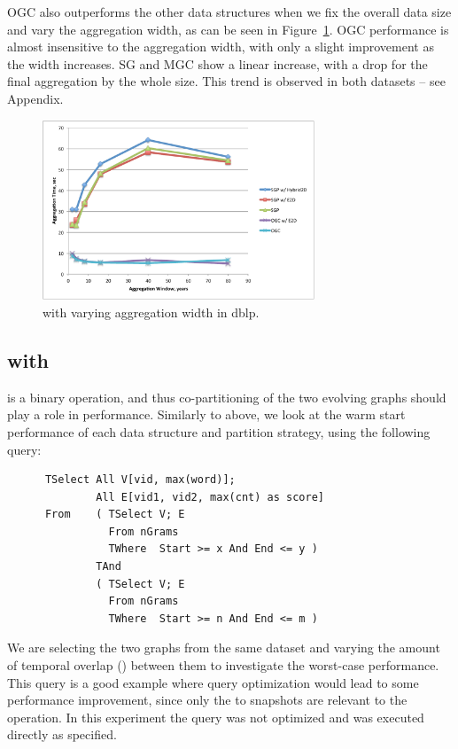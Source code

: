 OGC also outperforms the other data structures when we fix the overall
data size and vary the aggregation width, as can be seen in
Figure~\ref{fig:tgroupe_width}.  OGC performance is almost insensitive
to the aggregation width, with only a slight improvement as the width
increases.  SG and MGC show a linear increase, with a drop for the
final aggregation by the whole size.  This trend is observed in both
datasets -- see Appendix.

\begin{figure}[t]
\includegraphics[width=3.2in]{figs/tgroupe_width.pdf}
\caption{ with varying aggregation width in dblp.}
\label{fig:tgroupe_width}
\end{figure}

\subsection{ with }

 is a binary operation, and thus co-partitioning of the
two evolving graphs should play a role in performance.  Similarly to
 above, we look at the warm start performance of each
data structure and partition strategy, using the following query:

\begin{small}
\begin{verbatim}
      TSelect All V[vid, max(word)];
              All E[vid1, vid2, max(cnt) as score]
      From    ( TSelect V; E
                From nGrams
                TWhere  Start >= x And End <= y )
              TAnd
              ( TSelect V; E
                From nGrams
                TWhere  Start >= n And End <= m )      
\end{verbatim}
\end{small}

We are selecting the two graphs from the same dataset and varying the
amount of temporal overlap () between them to investigate
the worst-case performance.  This query is a good example where query
optimization would lead to some performance improvement, since only
the  to  snapshots are relevant to the operation.
In this experiment the query was not optimized and was executed
directly as specified.

